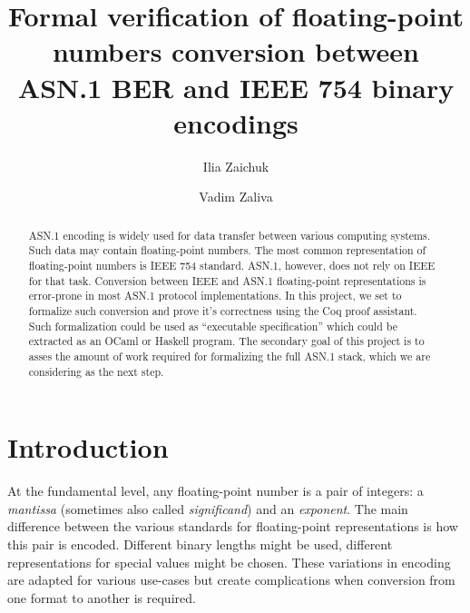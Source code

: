 \documentclass[sigplan]{acmart}
\begin{document}
\title{Formal verification of floating-point numbers conversion between ASN.1 BER and IEEE 754 binary encodings}

\author{Ilia Zaichuk}

\author{Vadim Zaliva}

\begin{abstract}

ASN.1 encoding is widely used for data transfer between various computing systems.
Such data may contain floating-point numbers. The most common representation of floating-point
numbers is IEEE 754 standard. ASN.1, however, does not rely
on IEEE for that task. Conversion between IEEE and ASN.1 floating-point
representations is error-prone in most ASN.1 protocol implementations. In this
project, we set to formalize such conversion and prove it's correctness using the Coq proof assistant.
Such formalization could be used as ``executable specification'' which could be
extracted as an OCaml or Haskell program. The secondary goal of this project is
to asses the amount of work required for formalizing the full ASN.1 stack, which
we are considering as the next step.

\end{abstract}


\maketitle



\section{Introduction}

At the fundamental level, any floating-point number is a pair of integers: a \textit{mantissa} (sometimes also called \textit{significand}) and an \textit{exponent}. The main difference between the various standards for floating-point representations is how this pair is encoded. Different binary lengths might be used, different representations for special values might be chosen. These variations in encoding are adapted for various use-cases but create complications when conversion from one format to another is required.
\end{document}
